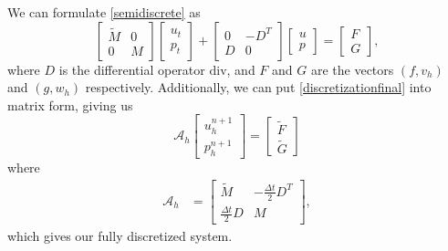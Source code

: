 \documentclass[11pt]{article}
\newcommand{\divv}{\mathrm{div}}
\begin{document}
We can formulate \eqref{semidiscrete} as
\begin{equation}
\begin{bmatrix}
\tilde{M} & 0\\
0 & M
\end{bmatrix} \begin{bmatrix}
u_t \\
p_t
\end{bmatrix} + \begin{bmatrix}
0 & -D^T \\
D & 0
\end{bmatrix} \begin{bmatrix}
u \\
p
\end{bmatrix} = \begin{bmatrix}
F \\
G
\end{bmatrix},
\end{equation} %
where $D$ is the differential operator $\divv$, and $F$ and $G$ are the vectors $(f,v_h)$ and $(g,w_h)$ respectively. Additionally, we can put \eqref{discretizationfinal} into matrix form, giving us
\begin{equation}\label{FEcoeffoperator}
\mathscr{A}_h
\begin{bmatrix}
u^{n+1}_h \\
p^{n+1}_h
\end{bmatrix}
=
\begin{bmatrix}
\tilde{F}\\
\tilde{G}
\end{bmatrix}
\end{equation}
where
\begin{equation}\label{discretcoefop}
\begin{split}
\mathscr{A}_h &= \begin{bmatrix}
\tilde{M} & -\frac{\Delta t}{2}D^T \\
\frac{\Delta t}{2}D & M
\end{bmatrix},
\end{split}
\end{equation} which gives our fully discretized system.
\end{document}
